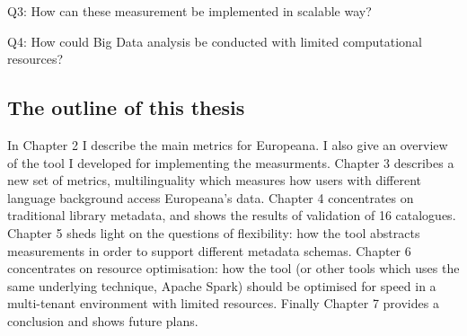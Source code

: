 Q3: How can these measurement be implemented in scalable way?

Q4: How could Big Data analysis be conducted with limited computational resources?

\subsection{The outline of this thesis}

In Chapter 2 I describe the main metrics for Europeana. I also give an overview of the tool I developed for implementing the measurments. Chapter 3 describes a new set of metrics, multilinguality which measures how users with different language background access Europeana's data. Chapter 4 concentrates on traditional library metadata, and shows the results of validation of 16 catalogues. Chapter 5 sheds light on the questions of flexibility: how the tool  abstracts measurements in order to  support different metadata schemas. Chapter 6 concentrates on resource optimisation: how the tool (or other tools which uses the same underlying technique, Apache Spark) should be optimised for speed in a multi-tenant environment with limited resources. Finally Chapter 7 provides a conclusion and shows future plans.
